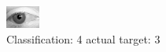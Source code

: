 \begin{figure}[h!]
\begin{center}
\includegraphics[width=0.60\columnwidth]{figures/ID2819_class_4_target_3.png}
\end{center}
\caption{ Classification: 4 actual target: 3}
\label{fig:ID2819_class_4_target_3}
\end{figure}
